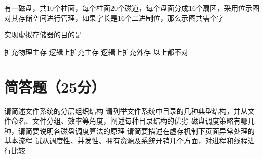 \documentclass{exam}
\newif\ifprint
\newcommand{\blank}[2][1cm]{\uline{\makebox[#1][c]{%
			\ifprint
			\phantom{#2}%
			\else
			#2%
			\fi}}}
\begin{document}
\begin{questions}
		\question[2]有一磁盘，共10个柱面，每个柱面20个磁道，每个盘面分成16个扇区，采用位示图对其存储空间进行管理，如果字长是16个二进制位，那么示图共需\blank{}个字
		\begin{choices}
		\end{choices}
		
		\question[2]实现虚拟存储器的目的是\blank{}
		\begin{choices}
			\choice 扩充物理主存
			\choice 逻辑上扩充主存
			\choice 逻辑上扩充外存
			\choice 以上都不对
		\end{choices}
	\end{questions}
	
\section{简答题（25分）}
	\begin{questions}
		\question[5] 请简述文件系统的分层组织结构
		\vspace{1cm}
		\question[5]请列举文件系统中目录的几种典型结构，并从文件命名、文件分组、效率等角度，阐述每种目录结构的优劣
		\vspace{1.5cm}
		\question[5]磁盘调度策略有哪几种，请简要说明各磁盘调度算法的原理
		\vspace{1.2cm}
		\question[5]请简要描述在虚存机制下页面异常处理的基本流程
		\vspace{1.3cm}
		\question[5]试从调度性、并发性、拥有资源及系统开销几个方面，对进程和线程进行比较
		\vspace{1cm}
	\end{questions}
\end{document}
